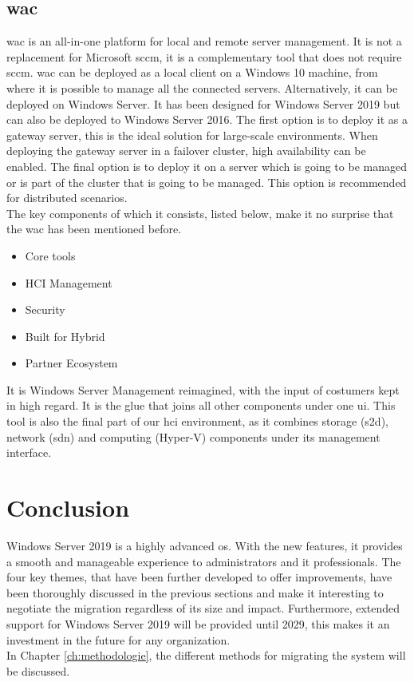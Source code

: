 \subsection{\acrfull{wac}}
\acrlong{wac} is an all-in-one platform for local and remote server management.
It is not a replacement for Microsoft \acrfull{sccm}, it is a complementary tool that does not require \acrshort{sccm}.	
\acrshort{wac} can be deployed as a local client on a Windows 10 machine, from where it is possible to manage all the connected servers. 
Alternatively, it can be deployed on Windows Server. 
It has been designed for Windows Server 2019 but can also be deployed to Windows Server 2016.
The first option is to deploy it as a gateway server, this is the ideal solution for large-scale environments.
When deploying the gateway server in a failover cluster, high availability can be enabled. 
The final option is to deploy it on a server which is going to be managed or is part of the cluster that is going to be managed. 
This option is recommended for distributed scenarios.\\
The key components of which it consists, listed below, make it no surprise that the \acrlong{wac} has been mentioned before. 
\begin{itemize}
	\item Core tools
	\item HCI Management
	\item Security
	\item Built for Hybrid
	\item Partner Ecosystem
\end{itemize}
It is Windows Server Management reimagined, with the input of costumers kept in high regard. 
It is the glue that joins all other components under one \acrfull{ui}. 
This tool is also the final part of our \acrshort{hci} environment, as it combines storage (\acrshort{s2d}), network (\acrshort{sdn}) and computing (Hyper-V) components under its management interface. 

\section{Conclusion}

Windows Server 2019 is a highly advanced \acrshort{os}. 
With the new features, it provides a smooth and manageable experience to administrators and \acrshort{it} professionals.
The four key themes, that have been further developed to offer improvements, have been thoroughly discussed in the previous sections and make it interesting to negotiate the migration regardless of its size and impact.
Furthermore, extended support for Windows Server 2019 will be provided until 2029, this makes it an investment in the future for any organization.\\
In Chapter \ref{ch:methodologie}, the different methods for migrating the system will be discussed.
